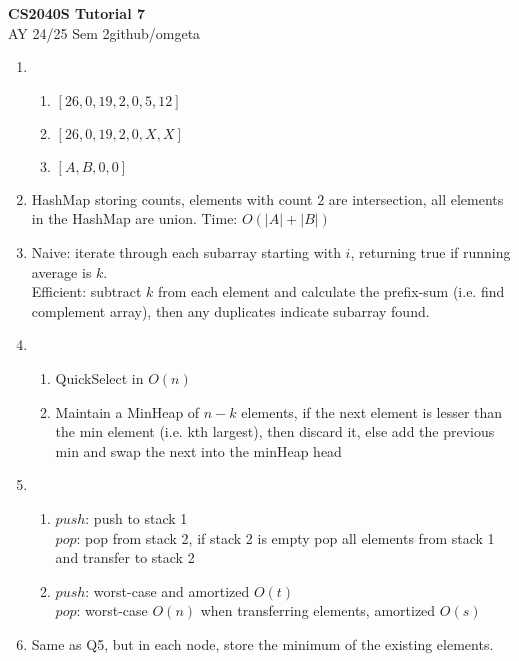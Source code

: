 \documentclass[12pt, a4paper]{article}
\newcommand{\mytitle}{CS2040S Tutorial 7}
\newcommand{\myauthor}{github/omgeta}
\newcommand{\mydate}{AY 24/25 Sem 2}
\begin{document}
\raggedright
\footnotesize
\begin{center}
{\normalsize{\textbf{\mytitle}}} \\
{\footnotesize{\mydate\hspace{2pt}\textemdash\hspace{2pt}\myauthor}}
\end{center}
\begin{enumerate}[Q\arabic*.]
  \item 
    \begin{enumerate}[(\alph*)]
      \item $[26, 0, 19, 2, 0, 5, 12]$ 

      \item $[26, 0, 19, 2, 0, X, X]$ 

      \item $[A, B, 0, 0]$
    \end{enumerate}

  \item HashMap storing counts, elements with count $2$ are intersection, all elements in the HashMap are union. Time: $O(|A| + |B|)$

  \item Naive: iterate through each subarray starting with $i$, returning true if running average is $k$.\\
    Efficient: subtract $k$ from each element and calculate the prefix-sum (i.e. find complement array), then any duplicates indicate subarray found.

  \item 
    \begin{enumerate}[(\alph*.)]
    
      \item QuickSelect in $O(n)$

      \item Maintain a MinHeap of $n-k$ elements, if the next element is lesser than the min element (i.e. kth largest), then discard it, else add the previous min and swap the next into the minHeap head 
    \end{enumerate}

  \item
    \begin{enumerate}[(\alph*.)]
      \item $push$: push to stack 1\\
        $pop$: pop from stack 2, if stack 2 is empty pop all elements from stack 1 and transfer to stack 2

      \item $push$: worst-case and amortized $O(t)$\\
        $pop$: worst-case $O(n)$ when transferring elements, amortized $O(s)$
    \end{enumerate}

  \item Same as Q5, but in each node, store the minimum of the existing elements. 
\end{enumerate}
\end{document}
